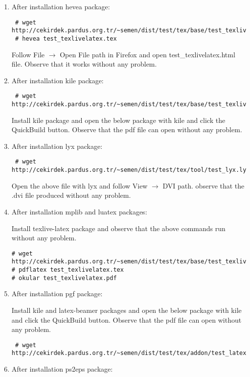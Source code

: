 \documentclass[a4paper,10pt]{article}
\begin{document}
\begin{enumerate}
\item After installation hevea package:
 \begin{verbatim}
 # wget http://cekirdek.pardus.org.tr/~semen/dist/test/tex/base/test_texlivelatex.tex
 # hevea test_texlivelatex.tex
 \end{verbatim}
Follow File $\rightarrow$ Open File path in Firefox and open test\_texlivelatex.html file. Observe that it works without any problem.

\item After installation kile package:
 \begin{verbatim}
 # wget http://cekirdek.pardus.org.tr/~semen/dist/test/tex/base/test_texlivelatex.tex
 \end{verbatim}

Install kile package and open the below package with kile and click the QuickBuild button. Observe that the pdf file can open without any problem.

\item After installation lyx package:
 \begin{verbatim}
 # wget http://cekirdek.pardus.org.tr/~semen/dist/test/tex/tool/test_lyx.lyx
 \end{verbatim}

Open the above file with lyx and follow View $\rightarrow$ DVI path. observe that the .dvi file produced without any problem.

\item After installation mplib and luatex packages:
  
Install texlive-latex package and observe that the above commands run without any problem.

\begin{verbatim}
# wget http://cekirdek.pardus.org.tr/~semen/dist/test/tex/base/test_texlivelatex.tex
# pdflatex test_texlivelatex.tex
# okular test_texlivelatex.pdf
\end{verbatim}

\item After installation pgf package:

Install kile and latex-beamer packages and open the below package with kile and click the QuickBuild button. Observe that the pdf file can open without any problem.
\begin{verbatim}
 # wget http://cekirdek.pardus.org.tr/~semen/dist/test/tex/addon/test_latexbeamer.tex
\end{verbatim}


\item After installation ps2eps package:


\end{enumerate}
\end{document}
